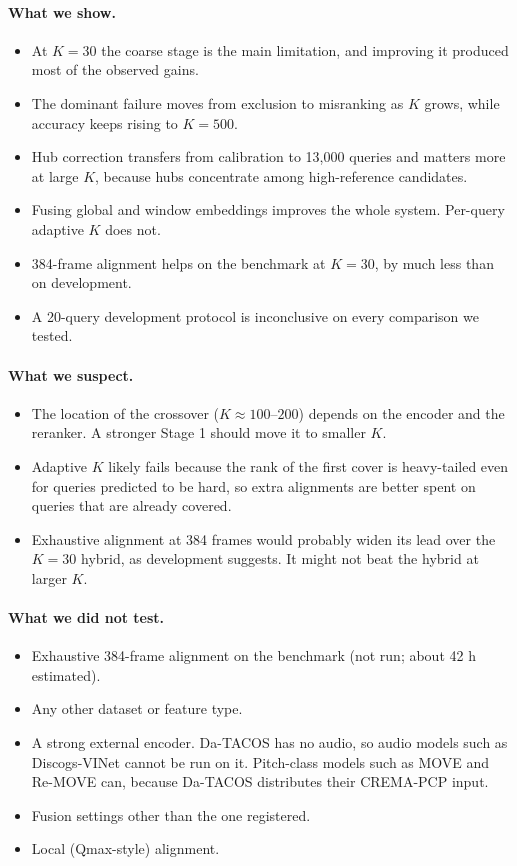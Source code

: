 \documentclass[10pt]{article}
\begin{document}
\paragraph{What we show.}
\begin{itemize}
\item At $K=30$ the coarse stage is the main limitation, and improving it produced most of the observed gains.
\item The dominant failure moves from exclusion to misranking as $K$ grows, while accuracy keeps rising to $K=500$.
\item Hub correction transfers from calibration to 13{,}000 queries and matters more at large $K$, because hubs concentrate among high-reference candidates.
\item Fusing global and window embeddings improves the whole system. Per-query adaptive $K$ does not.
\item 384-frame alignment helps on the benchmark at $K=30$, by much less than on development.
\item A 20-query development protocol is inconclusive on every comparison we tested.
\end{itemize}

\paragraph{What we suspect.}
\begin{itemize}
\item The location of the crossover ($K\approx100$--$200$) depends on the encoder and the reranker. A stronger Stage 1 should move it to smaller $K$.
\item Adaptive $K$ likely fails because the rank of the first cover is heavy-tailed even for queries predicted to be hard, so extra alignments are better spent on queries that are already covered.
\item Exhaustive alignment at 384 frames would probably widen its lead over the $K=30$ hybrid, as development suggests. It might not beat the hybrid at larger $K$.
\end{itemize}

\paragraph{What we did not test.}
\begin{itemize}
\item Exhaustive 384-frame alignment on the benchmark (not run; about 42 h estimated).
\item Any other dataset or feature type.
\item A strong external encoder. Da-TACOS has no audio, so audio models such as Discogs-VINet \citep{discogsvi} cannot be run on it. Pitch-class models such as MOVE and Re-MOVE \citep{move2020,remove2020} can, because Da-TACOS distributes their CREMA-PCP input.
\item Fusion settings other than the one registered.
\item Local (Qmax-style) alignment.
\end{itemize}
\end{document}
